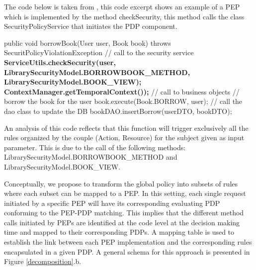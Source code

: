 The code below is taken from \cite{legacy}, this code excerpt shows an example of a PEP which is implemented by the method 
checkSecurity, this method calls the class SecurityPolicyService that initiates the PDP component.
\begin{algorithmic}
\begin{algorithm}[!h]
   \STATE public void borrowBook(User user, Book book)
   \STATE throws SecuritPolicyViolationException {
   \STATE   // call to the security service
\STATE \hspace{0.5cm} \textbf{ServiceUtils.checkSecurity(user,
\STATE LibrarySecurityModel.BORROWBOOK\_METHOD,
\STATE LibrarySecurityModel.BOOK\_VIEW);
\STATE ContextManager.getTemporalContext());}
    \STATE  // call to business objects
    \STATE  // borrow the book for the user
\STATE \hspace{0.5cm} book.execute(Book.BORROW, user);
\STATE      // call the dao class to update the DB
\STATE \hspace{0.5cm} bookDAO.insertBorrow(userDTO, bookDTO);}
\end{algorithm}
\end{algorithmic}

An analysis of this code reflects that this function will trigger exclusively all the rules organized by the couple (Action, Resource) for 
the subject given as input parameter. This is due to the call of the following methods: LibrarySecurityModel.BORROWBOOK\_METHOD and 
LibrarySecurityModel.BOOK\_VIEW.

Conceptually, we propose to transform the global policy into subsets of rules where each subset can be mapped to a PEP.
In this setting, each single request initiated by a specific PEP will have its corresponding evaluating PDP conforming to the PEP-PDP matching. 
This implies that the different method calls initiated by PEPs are identified at the code level at the decision making time and mapped to their 
corresponding PDPs. A mapping table is used to establish the link between each PEP implementation and the corresponding rules 
encapsulated in a given PDP. A general schema for this approach is presented in Figure \ref{decomposition}.b.

